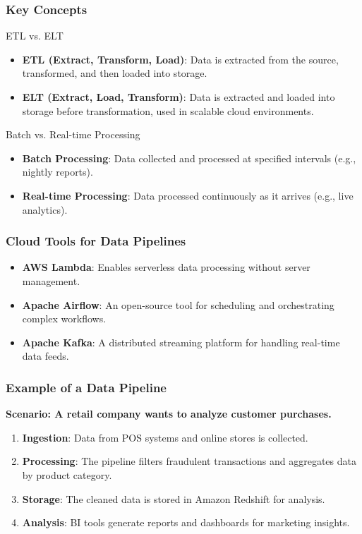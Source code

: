\documentclass[aspectratio=169]{beamer}
\begin{document}
\begin{frame}[fragile]
    \frametitle{Key Concepts}
    \begin{block}{ETL vs. ELT}
        \begin{itemize}
            \item \textbf{ETL (Extract, Transform, Load)}: Data is extracted from the source, transformed, and then loaded into storage.
            \item \textbf{ELT (Extract, Load, Transform)}: Data is extracted and loaded into storage before transformation, used in scalable cloud environments.
        \end{itemize}
    \end{block}

    \begin{block}{Batch vs. Real-time Processing}
        \begin{itemize}
            \item \textbf{Batch Processing}: Data collected and processed at specified intervals (e.g., nightly reports).
            \item \textbf{Real-time Processing}: Data processed continuously as it arrives (e.g., live analytics).
        \end{itemize}
    \end{block}
\end{frame}

\begin{frame}[fragile]
    \frametitle{Cloud Tools for Data Pipelines}
    \begin{itemize}
        \item \textbf{AWS Lambda}: Enables serverless data processing without server management.
        \item \textbf{Apache Airflow}: An open-source tool for scheduling and orchestrating complex workflows.
        \item \textbf{Apache Kafka}: A distributed streaming platform for handling real-time data feeds.
    \end{itemize}
\end{frame}

\begin{frame}[fragile]
    \frametitle{Example of a Data Pipeline}
    \textbf{Scenario: A retail company wants to analyze customer purchases.}
    \begin{enumerate}
        \item \textbf{Ingestion}: Data from POS systems and online stores is collected.
        \item \textbf{Processing}: The pipeline filters fraudulent transactions and aggregates data by product category.
        \item \textbf{Storage}: The cleaned data is stored in Amazon Redshift for analysis.
        \item \textbf{Analysis}: BI tools generate reports and dashboards for marketing insights.
    \end{enumerate}
\end{frame}
\end{document}
